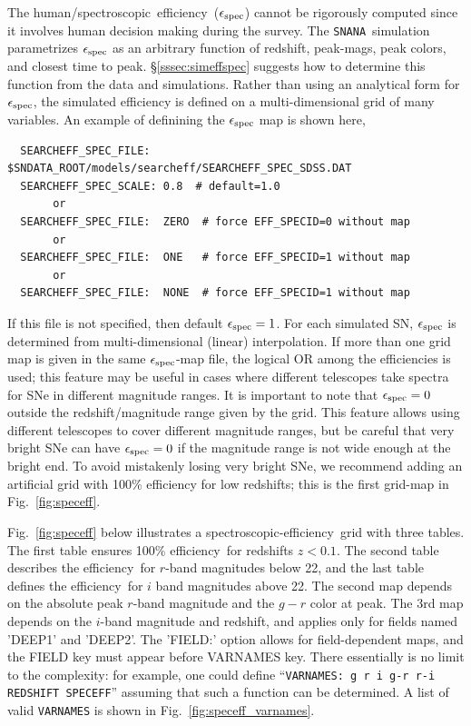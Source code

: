\documentclass[12pt]{article}
\newcommand{\snana}{{\tt SNANA}}
\newcommand{\eff}{efficiency}
\newcommand{\simeffspec}{\epsilon_{\rm spec}}
\newcommand{\spec}{spectroscopic}
\begin{document}
{The human/\spec\ \eff\ ($\simeffspec$) cannot be rigorously computed
since it involves human decision making during the survey.
The \snana\ simulation parametrizes $\simeffspec$ as an arbitrary
function of redshift, peak-mags, peak colors, and closest time to peak.
\S\ref{sssec:simeffspec} suggests how to determine
this function from the data and simulations.
Rather than using an analytical form for $\simeffspec$,
the simulated efficiency is defined on a multi-dimensional
grid of many variables.
An example of definining the $\simeffspec$ map is shown here,
\begin{verbatim}
  SEARCHEFF_SPEC_FILE:  $SNDATA_ROOT/models/searcheff/SEARCHEFF_SPEC_SDSS.DAT
  SEARCHEFF_SPEC_SCALE: 0.8  # default=1.0
       or
  SEARCHEFF_SPEC_FILE:  ZERO  # force EFF_SPECID=0 without map
       or
  SEARCHEFF_SPEC_FILE:  ONE   # force EFF_SPECID=1 without map
       or
  SEARCHEFF_SPEC_FILE:  NONE  # force EFF_SPECID=1 without map
\end{verbatim}
If this file is not specified, then default $\simeffspec=1$.
For each simulated SN, $\simeffspec$ is determined from 
multi-dimensional (linear) interpolation. 
If more than one grid map is given in the same $\simeffspec$-map file,
the logical OR among the efficiencies is used;
this feature may be useful in cases where different telescopes
take spectra for SNe in different magnitude ranges.
It is important to note that $\simeffspec=0$ outside
the redshift/magnitude range given by the grid.
This feature allows using different telescopes to cover
different magnitude ranges, but be careful that very bright
SNe can have $\simeffspec=0$ if the magnitude range is not
wide enough at the bright end. To avoid mistakenly losing 
very bright SNe, we recommend adding an artificial 
grid with 100\% efficiency for low redshifts;
this is the first grid-map in Fig.~\ref{fig:speceff}.


Fig.~\ref{fig:speceff} below illustrates a
\spec-\eff\ grid with three tables.
The first table ensures 100\% \eff\ for redshifts $z<0.1$.
The second table describes the \eff\ for $r$-band magnitudes 
below 22, and the last table defines the \eff\ for
$i$ band magnitudes above 22. 
The second map depends on the absolute peak $r$-band magnitude
and the $g-r$ color at peak.
The 3rd map depends on the $i$-band magnitude and redshift,
and applies only for fields named 'DEEP1' and 'DEEP2'.
The 'FIELD:' option allows for field-dependent maps,
and the FIELD key must appear before VARNAMES key.
There essentially is no limit to the complexity: 
for example, one could define 
``{\tt VARNAMES: g  r  i  g-r  r-i  REDSHIFT SPECEFF}''
assuming that such a function can be determined.
A list of valid {\tt VARNAMES} is shown in 
Fig.~\ref{fig:speceff_varnames}.

}
\end{document}
